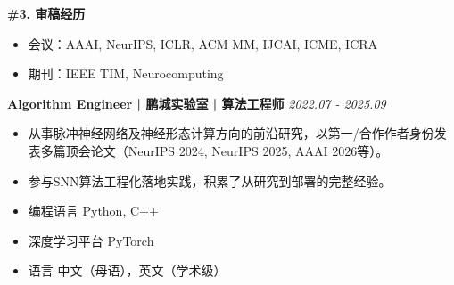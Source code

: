 \documentclass{resume}
\begin{document}
\vspace{5pt}
{ \textbf{\#3. 审稿经历}
\\\vspace{-18pt}}%
\begin{itemize}
    \item 会议：AAAI, NeurIPS, ICLR, ACM MM, IJCAI, ICME, ICRA
    \item 期刊：IEEE TIM, Neurocomputing
\end{itemize}

\vspace{5pt}


\textbf{Algorithm Engineer | 鹏城实验室 | 算法工程师}
\hfill \textit{2022.07 - 2025.09}\\\vspace{-15pt}%
\begin{itemize}[label=\textbullet, leftmargin=*]
\item 从事脉冲神经网络及神经形态计算方向的前沿研究，以第一/合作作者身份发表多篇顶会论文（NeurIPS 2024, NeurIPS 2025, AAAI 2026等）。
\item 参与SNN算法工程化落地实践，积累了从研究到部署的完整经验。
\end{itemize}

\vspace{5pt}

\begin{itemize}
    \item 编程语言 \hspace{0.765cm} Python, C++
    \item 深度学习平台 \hspace{0.12cm} PyTorch
    \item 语言 \hspace{1.4cm} 中文（母语），英文（学术级）
\end{itemize}
\end{document}

